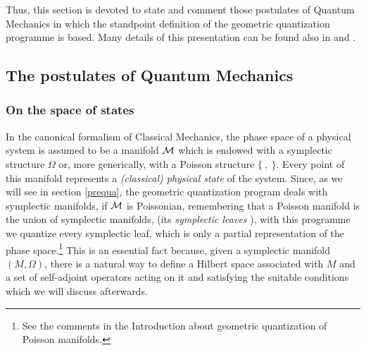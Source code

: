 \documentclass[12pt]{article}
\theoremstyle{plain}
\begin{document}
Thus, this section is devoted to state and comment
those postulates of Quantum Mechanics in which the standpoint
definition of the geometric quantization programme is based.
Many details of this presentation can be found also in
\cite{Ki-gq} and \cite{Tu-96}.



\subsection{The postulates of Quantum Mechanics}


\subsubsection{On the space of states}


In the canonical formalism of Classical Mechanics,
the phase space of a physical system is assumed to be a manifold ${\cal
M}$
which is endowed with a symplectic structure $\Omega$
or, more generically, with a Poisson structure $\{\ ,\ \}$.
Every point of this manifold represents a {\it (classical) physical
state} of the system.
Since, as we will see in section \ref{prequa},
the geometric quantization program deals with symplectic manifolds,
if ${\cal M}$ is Poissonian,
remembering that a Poisson manifold is the union of symplectic
manifolds,
(its {\it symplectic leaves} \cite{LM-87}), with this programme
we quantize every symplectic leaf, which is only a partial
representation of the phase space.\footnote{
See the comments in the Introduction about
geometric quantization of Poisson manifolds.
}
This is an essential fact because, given a symplectic manifold
$(M,\Omega )$,
there is a natural way to define a Hilbert space associated with $M$
and a set of self-adjoint operators acting on it and satisfying
the suitable conditions which we will discuss afterwards.
\end{document}
